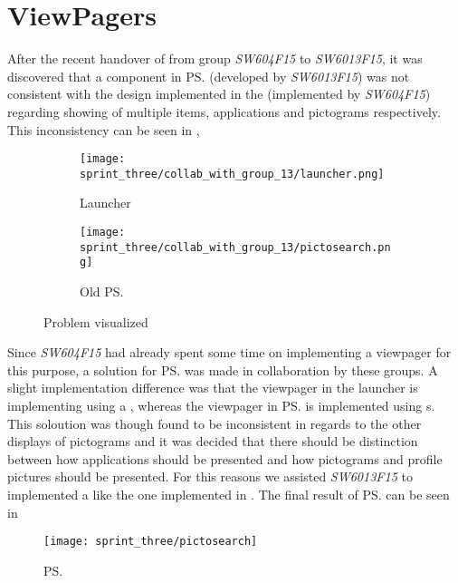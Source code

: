 
\section{ViewPagers} %
\label{sec:viewpagers}


After the recent handover of \gc from group \emph{SW604F15} to \emph{SW6013F15}, it was discovered that a component in \ps (developed by \emph{SW6013F15}) was not consistent with the design implemented in the \launcher (implemented by \emph{SW604F15}) regarding showing of multiple items, applications and pictograms respectively. This inconsistency can be seen in , 

\begin{figure}[!htbp]
    \centering

    \begin{subfigure}[t]{0.4\textwidth}
        \texttt{[image: sprint\_three/collab\_with\_group\_13/launcher.png]}
        \caption{Launcher}
        \label{fig:collab_with_group_13_launhcer}
    \end{subfigure}
    \hspace{5em} 
    \begin{subfigure}[t]{0.4\textwidth}
        \texttt{[image: sprint\_three/collab\_with\_group\_13/pictosearch.png]}
        \caption{Old \ps}
        \label{fig:collab_with_group_13_pictosearch}
    \end{subfigure}
    
    \caption{Problem visualized}
    \label{fig:collab_with_group_13}
\end{figure}

Since \emph{SW604F15} had already spent some time on implementing a viewpager for this purpose, a solution for \ps was made in collaboration by these groups. A slight implementation difference was that the viewpager in the launcher is implementing using a , whereas the viewpager in \ps is implemented using s. This soloution was though found to be inconsistent in regards to the other displays of pictograms and it was decided that there should be distinction between how applications should be presented and how pictograms and profile pictures should be presented. For this reasons we assisted \emph{SW6013F15} to implemented a  like the one implemented in \ct. The final result of \ps can be seen in 


\begin{figure}[!htbp]
    \centering
    \texttt{[image: sprint\_three/pictosearch]}
    \caption{\ps}
    \label{fig:pictosearch}
\end{figure}